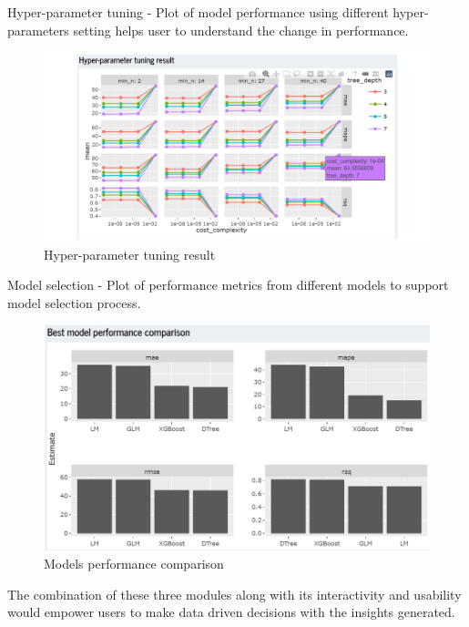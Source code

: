 \documentclass{acm_proc_article-sp}
\begin{document}
Hyper-parameter tuning - Plot of model performance using different
hyper-parameters setting helps user to understand the change in
performance.

\begin{figure}[H]

{\centering \includegraphics[width=1\linewidth]{images/hypartune} 

}

\caption{Hyper-parameter tuning result}\label{fig:unnamed-chunk-15}
\end{figure}

Model selection - Plot of performance metrics from different models to
support model selection process.

\begin{figure}[H]

{\centering \includegraphics[width=1\linewidth]{images/mdlcompare} 

}

\caption{Models performance comparison}\label{fig:unnamed-chunk-16}
\end{figure}

The combination of these three modules along with its interactivity and
usability would empower users to make data driven decisions with the
insights generated.
\end{document}
